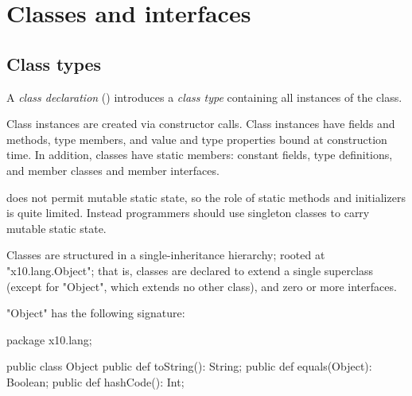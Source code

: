 \section{Classes and interfaces}
\label{ReferenceTypes}

\subsection{Class types}


        A {\em class declaration} ()
        introduces a 
        {\em class type}
        containing all instances of the class.

        Class instances are created via
        constructor calls.  Class instances have fields and
        methods, type members, and value and type properties bound at
        construction time.  In addition, classes have static
        members: constant fields, type definitions, and member
        classes and member interfaces.

\Xten{} does
not
permit mutable static state, so the role of static methods and
initializers is quite limited. Instead programmers should use
singleton classes to carry mutable static state.


        Classes
        are structured in a
        single-inheritance hierarchy;
         rooted at \xcd"x10.lang.Object"; that is,
        classes are declared to extend a single
        superclass (except for \xcd"Object", which extends no other class),
        and zero or more interfaces.

\xcd"Object" has the following signature:

\begin{xten}
package x10.lang;

public class Object {
    public def toString(): String;
    public def equals(Object): Boolean;
    public def hashCode(): Int;
}
\end{xten}



